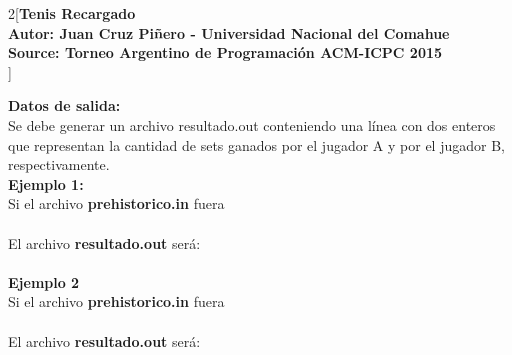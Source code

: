 \documentclass[a4paper,12pt]{article}
\begin{document}
\begin{multicols}{2}[\center\textbf{\large{Tenis Recargado\\\small{Autor: Juan Cruz Piñero - Universidad Nacional del Comahue\\ 
Source: Torneo Argentino de Programación ACM-ICPC 2015 \\}}}]
\begin{itemize}
\end{itemize}

\textbf{Datos de salida:} \\
Se debe generar un archivo resultado.out conteniendo una línea con dos enteros que representan la cantidad de sets ganados por el jugador A y por el jugador B, respectivamente.\\




\textbf{Ejemplo 1:} \\
Si el archivo \textbf{prehistorico.in} fuera\\

\\

El archivo \textbf{resultado.out} será:\\

\\

\textbf{Ejemplo 2} \\
Si el archivo \textbf{prehistorico.in} fuera\\

\\

El archivo \textbf{resultado.out} será:\\


\end{multicols}
\end{document}
